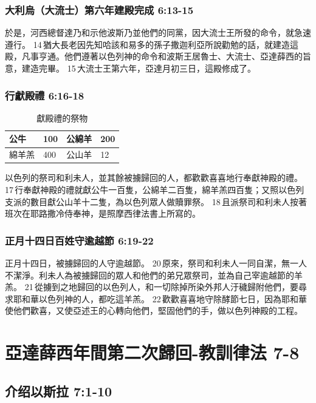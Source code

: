 \subsubsection{大利烏（大流士）第六年建殿完成 6:13-15}
於是，河西總督達乃和示他波斯乃並他們的同黨，因大流士王所發的命令，就急速遵行。 14 猶大長老因先知哈該和易多的孫子撒迦利亞所說勸勉的話，就建造這殿，凡事亨通。他們遵著以色列神的命令和波斯王居魯士、大流士、亞達薛西的旨意，建造完畢。 15 大流士王第六年，亞達月初三日，這殿修成了。

\subsubsection{行獻殿禮 6:16-18}
\begin{table}[!hbp]
\centering 
\begin{tabular}{p{1.5cm}|p{1.5cm}|p{1.5cm}|p{1.5cm}}
\hline
\hline
公牛 & 100 &公綿羊& 200 \\\hline
綿羊羔& 400&公山羊 &12  \\\hline
\end{tabular}
\caption{獻殿禮的祭物}
\end{table}
以色列的祭司和利未人，並其餘被擄歸回的人，都歡歡喜喜地行奉獻神殿的禮。 17 行奉獻神殿的禮就獻公牛一百隻，公綿羊二百隻，綿羊羔四百隻；又照以色列支派的數目獻公山羊十二隻，為以色列眾人做贖罪祭。 18 且派祭司和利未人按著班次在耶路撒冷侍奉神，是照摩西律法書上所寫的。

\subsubsection{正月十四日百姓守逾越節 6:19-22}	 
正月十四日，被擄歸回的人守逾越節。 20 原來，祭司和利未人一同自潔，無一人不潔淨。利未人為被擄歸回的眾人和他們的弟兄眾祭司，並為自己宰逾越節的羊羔。 21 從擄到之地歸回的以色列人，和一切除掉所染外邦人汙穢歸附他們，要尋求耶和華以色列神的人，都吃這羊羔。 22 歡歡喜喜地守除酵節七日，因為耶和華使他們歡喜，又使亞述王的心轉向他們，堅固他們的手，做以色列神殿的工程。
	 
\section{亞達薛西年間第二次歸回-教訓律法 7-8}
\subsection{介绍以斯拉 7:1-10}
